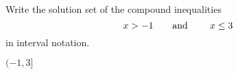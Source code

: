 

Write the solution set of the compound inequalities
\[x>-1 \text{\quad\quad and \quad\quad} x\leq 3 \]
in interval notation.

\begin{solution}
$(-1, 3]$
\end{solution}